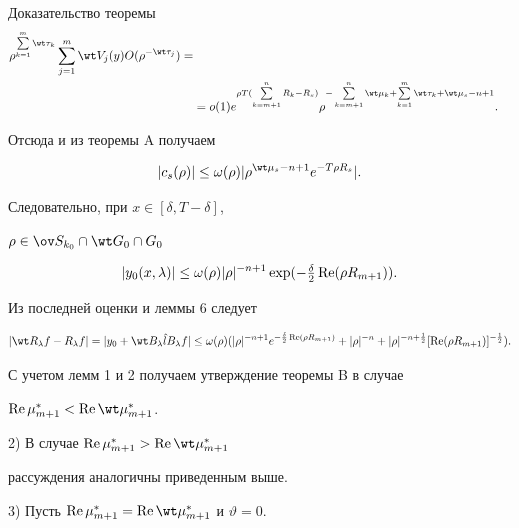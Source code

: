 \begin{pf*}{Доказательство теоремы}
\begin{align*}
\rho^{\suml^m_{k=1}\wt\tau_k}\sum^m_{j=1}\wt V_j(y)


O(\rho^{-\wt\tau_j}) =\\


&= o(1)e^{\rho T(\suml^n_{k=m+1}R_k-R_s)}


\rho^{-\suml^n_{k=m+1}\wt\mu_k+\suml^m_{k=1}\wt\tau_k+


\wt\mu_s-n+1}.


\end{align*}


Отсюда и из теоремы A получаем


$$


|c_s(\rho)|\le\omega(\rho)|\rho^{\wt\mu_s-n+1}


e^{-T\rho R_s}|.


$$


Следовательно, при $x\in[\delta,T-\delta]$,


$\rho\in\ov S_{k_0}\cap\wt G_0\cap G_0$


$$


|y_0(x,\lambda)|\le\omega(\rho)|\rho|^{-n+1}


\exp(-\tfrac{\delta}{2}\re(\rho R_{m+1})).


$$


Из последней оценки и леммы 6 следует


$$


|\wt R_\lambda f-R_\lambda f|=|y_0+\wt B_\lambda\Hat l


B_\lambda f|\le \omega(\rho)(|\rho|^{-n+1}


e^{-\frac{\delta}{2}\re(\rho R_{m+1})}+|\rho|^{-n}


+|\rho|^{-n+\frac{1}{2}}[\re(\rho R_{m+1})]^{-\frac{1}{2}}).


$$





С учетом лемм 1 и 2 получаем утверждение теоремы B в случае


$\re\mu^*_{m+1}<\re\wt\mu^*_{m+1}$.





2) В случае $\re\mu^*_{m+1}>\re\wt\mu^*_{m+1}$


рассуждения аналогичны приведенным выше.





3) Пусть $\re\mu^*_{m+1}=\re\wt\mu^*_{m+1}$ и $\vartheta=0$.






\end{pf*}

